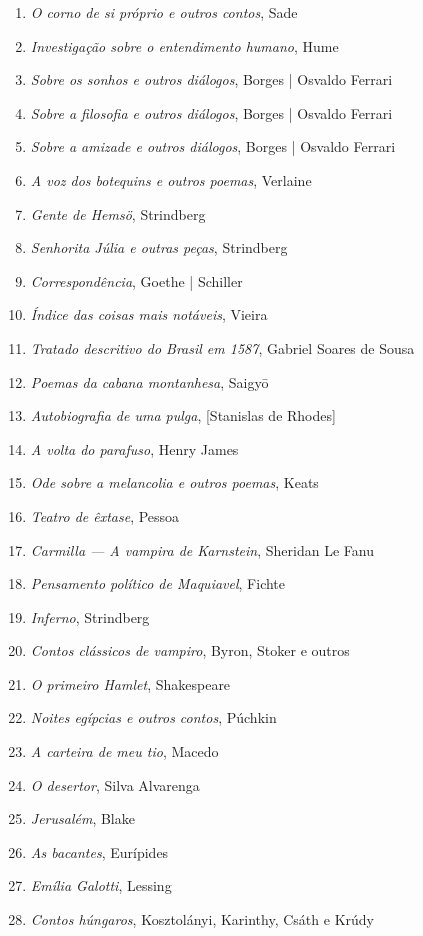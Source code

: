 \begin{enumerate}
\item \textit{O corno de si próprio e outros contos}, Sade
\item \textit{Investigação sobre o entendimento humano}, Hume
\item \textit{Sobre os sonhos e outros diálogos}, Borges | Osvaldo Ferrari
\item \textit{Sobre a filosofia e outros diálogos}, Borges | Osvaldo Ferrari
\item \textit{Sobre a amizade e outros diálogos}, Borges | Osvaldo Ferrari
\item \textit{A voz dos botequins e outros poemas}, Verlaine 
\item \textit{Gente de Hemsö}, Strindberg 
\item \textit{Senhorita Júlia e outras peças}, Strindberg 
\item \textit{Correspondência}, Goethe | Schiller
\item \textit{Índice das coisas mais notáveis}, Vieira
\item \textit{Tratado descritivo do Brasil em 1587}, Gabriel Soares de Sousa
\item \textit{Poemas da cabana montanhesa}, Saigy\=o
\item \textit{Autobiografia de uma pulga}, [Stanislas de Rhodes]
\item \textit{A volta do parafuso}, Henry James
\item \textit{Ode sobre a melancolia e outros poemas}, Keats 
\item \textit{Teatro de êxtase}, Pessoa
\item \textit{Carmilla --- A vampira de Karnstein}, Sheridan Le Fanu
\item \textit{Pensamento político de Maquiavel}, Fichte
\item \textit{Inferno}, Strindberg
\item \textit{Contos clássicos de vampiro}, Byron, Stoker e outros
\item \textit{O primeiro Hamlet}, Shakespeare
\item \textit{Noites egípcias e outros contos}, Púchkin
\item \textit{A carteira de meu tio}, Macedo
\item \textit{O desertor}, Silva Alvarenga
\item \textit{Jerusalém}, Blake
\item \textit{As bacantes}, Eurípides
\item \textit{Emília Galotti}, Lessing
\item \textit{Contos húngaros}, Kosztolányi, Karinthy, Csáth e Krúdy

\end{enumerate}
